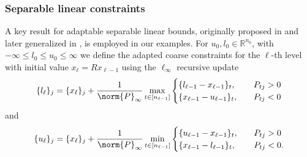 \documentclass[11pt,reqno]{amsart}
\numberwithin{equation}{section}
\numberwithin{figure}{section}
\theoremstyle{plain}
\theoremstyle{definition}
\newcommand{\R}{\mathbb{R}}
\begin{document}
\subsubsection{Separable linear constraints} \label{appdx:constraints_separable_linear}
A key result for adaptable separable linear bounds, originally proposed in \cite{Gelman1990} and later generalized in \cite{Gratton:2008}, is employed in our examples. For $u_0, l_0 \in \R^{n_0}$, with $-\infty \leq l_0 \leq u_0 \leq \infty$ we define the adapted coarse constraints for the $\ell$-th level with initial value $x_\ell = Rx_{\ell-1}$ using the $\ell_\infty$ recursive update 
\begin{equation} \label{eq: recursive lower bound}
    \{l_\ell\}_j = \{x_\ell\}_j + \frac{1}{\norm{P}_\infty} \max_{t \in [n_{\ell -1}]} \begin{cases}
        \{l_{\ell - 1} - x_{\ell - 1}\}_t, & \quad P_{tj} > 0 \\
        \{x_{\ell - 1} - u_{\ell - 1}\}_t, & \quad P_{tj} < 0
    \end{cases}
\end{equation}
and
\begin{equation} \label{eq: recursive upper bound}
    \{u_\ell\}_j = \{x_\ell\}_j + \frac{1}{\norm{P}_\infty} \min_{t \in [n_{\ell -1}]} \begin{cases}
        \{u_{\ell - 1} - x_{\ell - 1}\}_t, & \quad P_{tj} > 0 \\
        \{x_{\ell - 1} - l_{\ell - 1}\}_t, & \quad P_{tj} < 0.
    \end{cases}
\end{equation}
\end{document}
